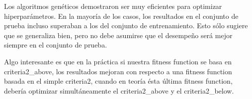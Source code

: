 \documentclass[11pt]{article}
\begin{document}
Los algoritmos genéticos demostraron ser muy eficientes para optimizar hiperparámetros. En la mayoría de los casos, los resultados en el conjunto de prueba incluso superaban a los del conjunto de entrenamiento. Esto sólo sugiere que se generaliza bien, pero no debe asumirse que el desempeño será mejor siempre en el conjunto de prueba.

Algo interesante es que en la práctica si nuestra fitness function se basa en criteria2\_above, los resultados mejoran con respecto a una fitness function basada en el simple criteria2, cuando en teoría ésta última fitness function, debería optimizar simultáneamente el criteria2\_above y el criteria2\_below. 
\end{document}
